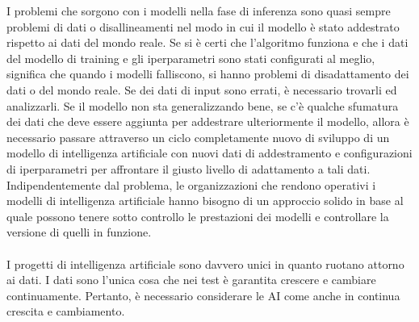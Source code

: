 \documentclass[a4paper,12pt]{report}
\begin{document}
I problemi che sorgono con i modelli nella fase di inferenza sono quasi sempre problemi di dati o disallineamenti nel modo in cui il modello è stato addestrato rispetto ai dati del mondo reale. Se si è certi che l'algoritmo funziona e che i dati del modello di training e gli iperparametri sono stati configurati al meglio, significa che quando i modelli falliscono, si hanno problemi di disadattamento dei dati o del mondo reale. Se dei dati di input sono errati, è necessario trovarli ed analizzarli. Se il modello non sta generalizzando bene, se c'è qualche sfumatura dei dati che deve essere aggiunta per addestrare ulteriormente il modello, allora è necessario passare attraverso un ciclo completamente nuovo di sviluppo di un modello di intelligenza artificiale con nuovi dati di addestramento e configurazioni di iperparametri per affrontare il giusto livello di adattamento a tali dati. Indipendentemente dal problema, le organizzazioni che rendono operativi i modelli di intelligenza artificiale hanno bisogno di un approccio solido in base al quale possono tenere sotto controllo le prestazioni dei modelli e controllare la versione di quelli in funzione.\\~\\
I progetti di intelligenza artificiale sono davvero unici in quanto ruotano attorno ai dati. I dati sono l'unica cosa che nei test è garantita crescere e cambiare continuamente. Pertanto, è necessario considerare le AI come anche in continua crescita e cambiamento. \cite{aitest}
\end{document}
